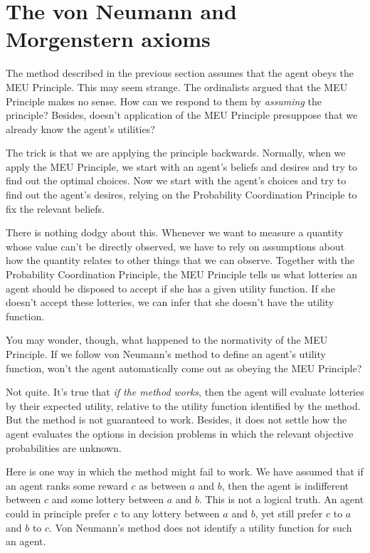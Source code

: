 \section{The von Neumann and Morgenstern axioms}\label{sec:vnm}

The method described in the previous section assumes that the agent obeys the
MEU Principle. This may seem strange. The ordinalists argued that the MEU
Principle makes no sense. How can we respond to them by \emph{assuming} the
principle? Besides, doesn't application of the MEU Principle presuppose that we
already know the agent's utilities?

The trick is that we are applying the principle backwards. Normally, when we
apply the MEU Principle, we start with an agent's beliefs and desires and try to
find out the optimal choices. Now we start with the agent's choices and try to
find out the agent's desires, relying on the Probability Coordination Principle
to fix the relevant beliefs.

There is nothing dodgy about this. Whenever we want to measure a quantity whose
value can't be directly observed, we have to rely on assumptions about how the
quantity relates to other things that we can observe. Together with the
Probability Coordination Principle, the MEU Principle tells us what lotteries
an agent should be disposed to accept if she has a given utility function. If
she doesn't accept these lotteries, we can infer that she doesn't have the
utility function.

You may wonder, though, what happened to the normativity of the MEU Principle.
If we follow von Neumann's method to define an agent's utility function, won't
the agent automatically come out as obeying the MEU Principle?

Not quite. It's true that \emph{if the method works}, then the agent will
evaluate lotteries by their expected utility, relative to the utility function
identified by the method. But the method is not guaranteed to work. Besides, it
does not settle how the agent evaluates the options in decision problems in which the
relevant objective probabilities are unknown.

Here is one way in which the method might fail to work. We have assumed that if
an agent ranks some reward $c$ as between $a$ and $b$, then the agent is
indifferent between $c$ and some lottery between $a$ and $b$. This is not a
logical truth. An agent could in principle prefer $c$ to any lottery between $a$
and $b$, yet still prefer $c$ to $a$ and $b$ to $c$. Von Neumann's method does
not identify a utility function for such an agent.

